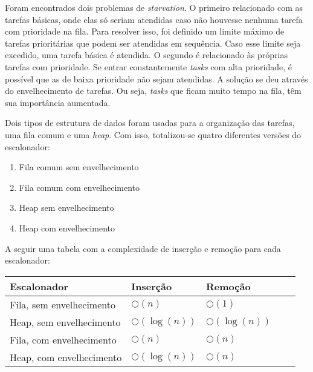 Foram encontrados dois problemas de \textit{starvation}. O primeiro relacionado com as tarefas básicas,
onde elas só seriam atendidas caso não houvesse nenhuma tarefa com prioridade na fila. Para resolver isso, foi definido um
limite máximo de tarefas prioritárias que podem ser atendidas em sequência. Caso esse limite seja excedido, uma tarefa
básica é atendida. O segundo é relacionado às próprias tarefas com prioridade. 
Se entrar constantemente \textit{tasks} com alta
prioridade, é possível que as de baixa prioridade não sejam atendidas. A solução se deu através do envelhecimento de
tarefas. Ou seja, \textit{tasks} que ficam muito tempo na fila, têm sua importância aumentada.

Dois tipos de estrutura de dados foram usadas para a organização das tarefas, uma fila comum e uma \textit{heap}. Com
isso, totalizou-se quatro diferentes versões do escalonador:
\begin{enumerate}
    \item Fila comum sem envelhecimento
    \item Fila comum com envelhecimento
    \item Heap sem envelhecimento
    \item Heap com envelhecimento
\end{enumerate}
A seguir uma tabela com a complexidade de inserção e remoção para cada escalonador:
\begin{center}
    \begin{tabular}{ | l | l | l | l | p{5cm} |}
    \hline
    Escalonador & Inserção & Remoção \\ \hline
    Fila, sem envelhecimento & $\bigcirc(n)$ & $\bigcirc(1)$ \\ \hline 
    Heap, sem envelhecimento & $\bigcirc(\log(n))$ & $\bigcirc(\log(n))$ \\ \hline
    Fila, com envelhecimento & $\bigcirc(n)$ & $\bigcirc(n)$ \\ \hline
    Heap, com envelhecimento & $\bigcirc(\log(n))$ & $\bigcirc(n)$ \\ \hline
    \end{tabular}
\end{center}

